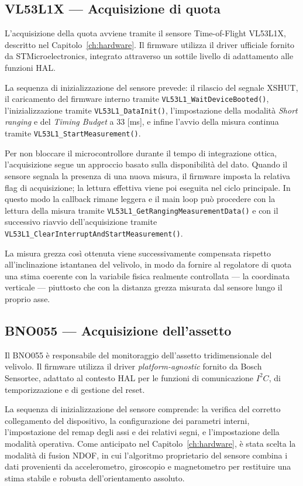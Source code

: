 \documentclass[11pt]{report}
\begin{document}
\subsection{VL53L1X — Acquisizione di quota}
L'acquisizione della quota avviene tramite il sensore Time-of-Flight VL53L1X, descritto nel Capitolo~\ref{ch:hardware}. Il firmware utilizza il driver ufficiale fornito da STMicroelectronics, integrato attraverso un sottile livello di adattamento alle funzioni HAL.

La sequenza di inizializzazione del sensore prevede: il rilascio del segnale XSHUT, il caricamento del firmware interno tramite \texttt{VL53L1\_WaitDeviceBooted()}, l'inizializzazione tramite \texttt{VL53L1\_DataInit()}, l'impostazione della modalità \textit{Short ranging} e del \textit{Timing Budget} a 33 [ms], e infine l'avvio della misura continua tramite \texttt{VL53L1\_StartMeasurement()}.

Per non bloccare il microcontrollore durante il tempo di integrazione ottica, l'acquisizione segue un approccio basato sulla disponibilità del dato. Quando il sensore segnala la presenza di una nuova misura, il firmware imposta la relativa flag di acquisizione; la lettura effettiva viene poi eseguita nel ciclo principale. In questo modo la callback rimane leggera e il main loop può procedere con la lettura della misura tramite \texttt{VL53L1\_GetRangingMeasurementData()} e con il successivo riavvio dell'acquisizione tramite \texttt{VL53L1\_ClearInterruptAndStartMeasurement()}.

La misura grezza così ottenuta viene successivamente compensata rispetto all'inclinazione istantanea del velivolo, in modo da fornire al regolatore di quota una stima coerente con la variabile fisica realmente controllata — la coordinata verticale — piuttosto che con la distanza grezza misurata dal sensore lungo il proprio asse.

\subsection{BNO055 — Acquisizione dell'assetto}
Il BNO055 è responsabile del monitoraggio dell'assetto tridimensionale del velivolo. Il firmware utilizza il driver \textit{platform-agnostic} fornito da Bosch Sensortec, adattato al contesto HAL per le funzioni di comunicazione $I^{2}C$, di temporizzazione e di gestione del reset.

La sequenza di inizializzazione del sensore comprende: la verifica del corretto collegamento del dispositivo, la configurazione dei parametri interni, l'impostazione del remap degli assi e dei relativi segni, e l'impostazione della modalità operativa. Come anticipato nel Capitolo~\ref{ch:hardware}, è stata scelta la modalità di fusion NDOF, in cui l'algoritmo proprietario del sensore combina i dati provenienti da accelerometro, giroscopio e magnetometro per restituire una stima stabile e robusta dell'orientamento assoluto.
\end{document}

